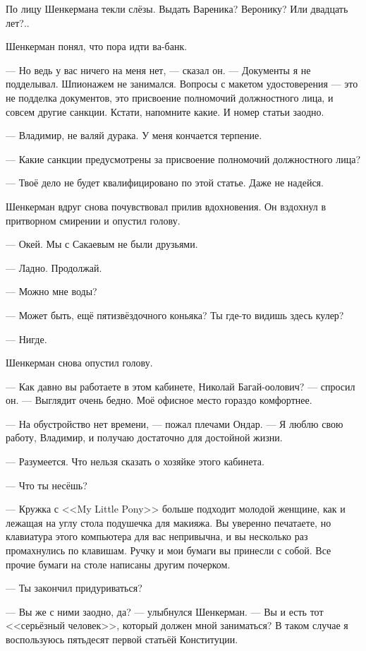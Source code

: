 \documentclass[a4paper,10pt,fleqn]{book}\usepackage{polyglossia}\setdefaultlanguage{english}\setotherlanguage{russian}\defaultfontfeatures{Ligatures=TeX,Mapping=tex-text} \usepackage{xcolor}\definecolor{lightgray}{HTML}{bbbbbb}\color{lightgray}\newcommand{\ml}[3]{\textcolor{black}{#3}}
\begin{document}
По лицу Шенкермана текли слёзы.
Выдать Вареника?
Веронику?
Или двадцать лет?..

Шенкерман понял, что пора идти ва-банк.

--- Но ведь у вас ничего на меня нет, --- сказал он.
--- Документы я не подделывал.
Шпионажем не занимался.
Вопросы с макетом удостоверения --- это не подделка документов, это присвоение полномочий должностного лица, и совсем другие санкции.
Кстати, напомните какие.
И номер статьи заодно.

--- Владимир, не валяй дурака.
У меня кончается терпение.

--- Какие санкции предусмотрены за присвоение полномочий должностного лица?

--- Твоё дело не будет квалифицировано по этой статье.
Даже не надейся.

Шенкерман вдруг снова почувствовал прилив вдохновения.
Он вздохнул в притворном смирении и опустил голову.

--- Окей.
Мы с Сакаевым не были друзьями.

--- Ладно.
Продолжай.

--- Можно мне воды?

--- Может быть, ещё пятизвёздочного коньяка?
Ты где-то видишь здесь кулер?

--- Нигде.

Шенкерман снова опустил голову.

--- Как давно вы работаете в этом кабинете, Николай Багай-оолович? --- спросил он.
--- Выглядит очень бедно.
Моё офисное место гораздо комфортнее.

--- На обустройство нет времени, --- пожал плечами Ондар.
--- Я люблю свою работу, Владимир, и получаю достаточно для достойной жизни.

--- Разумеется.
Что нельзя сказать о хозяйке этого кабинета.

--- Что ты несёшь?

--- Кружка с <<My Little Pony>> больше подходит молодой женщине, как и лежащая на углу стола подушечка для макияжа.
Вы уверенно печатаете, но клавиатура этого компьютера для вас непривычна, и вы несколько раз промахнулись по клавишам.
Ручку и мои бумаги вы принесли с собой.
Все прочие бумаги на столе написаны другим почерком.

--- Ты закончил придуриваться?

--- Вы же с ними заодно, да? --- улыбнулся Шенкерман.
--- Вы и есть тот <<серьёзный человек>>, который должен мной заниматься?
В таком случае я воспользуюсь пятьдесят первой статьёй Конституции.
\end{document}
